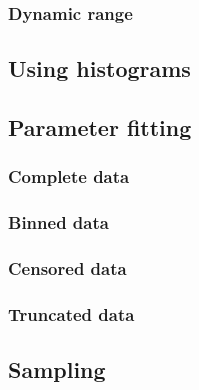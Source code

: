 \subsubsection{Dynamic range}


\subsection{Using histograms}

\subsection{Parameter fitting}
\subsubsection{Complete data}
\subsubsection{Binned data}
\subsubsection{Censored data}
\subsubsection{Truncated data}



\subsection{Sampling}








